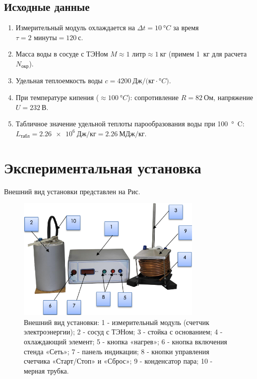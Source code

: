 \documentclass[12pt, a4paper]{article}
\begin{document}
\subsection*{Исходные данные}
\begin{enumerate}
    \item Измерительный модуль охлаждается на $\Delta t = \SI{10}{\degree C}$ за время $\tau = 2 \text{ минуты} = \SI{120}{с}$.
    \item Масса воды в сосуде с ТЭНом $M \approx 1 \text{ литр} \approx \SI{1}{кг}$ (примем \SI{1}{кг} для расчета $N_{\text{окр}}$).
    \item Удельная теплоемкость воды $c = \SI{4200}{Дж/(кг \cdot \degree C)}$.
    \item При температуре кипения ($\approx \SI{100}{\degree C}$): сопротивление $R = \SI{82}{Ом}$, напряжение $U = \SI{232}{В}$.
    \item Табличное значение удельной теплоты парообразования воды при \SI{100}{\degree C}: $L_{\text{табл}} = \SI{2,26e6}{Дж/кг} = \SI{2,26}{МДж/кг}$.
\end{enumerate}
\vspace{0.5cm}

\section{Экспериментальная установка}
Внешний вид установки представлен на Рис.
\begin{figure}[H]
    \centering
    \includegraphics[width=0.8\textwidth]{fig_1} %
    \caption{Внешний вид установки: 1 - измерительный модуль (счетчик электроэнергии); 2 - сосуд с ТЭНом; 3 - стойка с основанием; 4 - охлаждающий элемент; 5 - кнопка «нагрев»; 6 - кнопка включения стенда «Сеть»; 7 - панель индикации; 8 - кнопки управления счетчика «Старт/Стоп» и «Сброс»; 9 - конденсатор пара; 10 - мерная трубка.}
    \label{fig:setup}
\end{figure}
\vspace{0.5cm}
\end{document}
